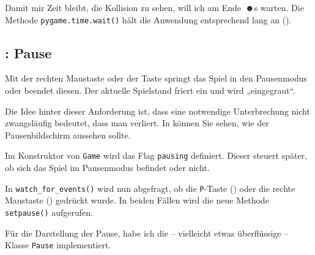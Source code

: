 
Damit mir Zeit bleibt, die Kollision zu sehen, will ich am Ende~☻\unit[2]{s} warten. Die Methode \texttt{pygame.time.wait()} hält die Anwendung entsprechend lang an ().



\subsection{: Pause}
 Mit der rechten Maustaste oder der Taste  springt das Spiel in den Pausenmodus oder beendet diesen. Der aktuelle Spielstand friert ein und wird „eingegraut“. 
\er

Die Idee hinter dieser Anforderung ist, dass eine notwendige Unterbrechung nicht zwangsläufig bedeutet, dass man verliert. In  können Sie sehen, wie der Pausenbildschirm aussehen sollte.


Im Konstruktor von \texttt{Game} wird das Flag \texttt{pausing} definiert. Dieser steuert später, ob sich das Spiel im Pausenmodus befindet oder nicht.

\newpage
{}  

In \texttt{watch\_for\_events()} wird nun abgefragt, ob die \texttt{P}-Taste () oder die rechte Maustaste () gedrückt wurde. In beiden Fällen wird die neue Methode \texttt{setpause()} aufgerufen. 



Für die Darstellung der Pause, habe ich die -- vielleicht etwas überflüssige -- Klasse \texttt{Pause} implementiert. 


